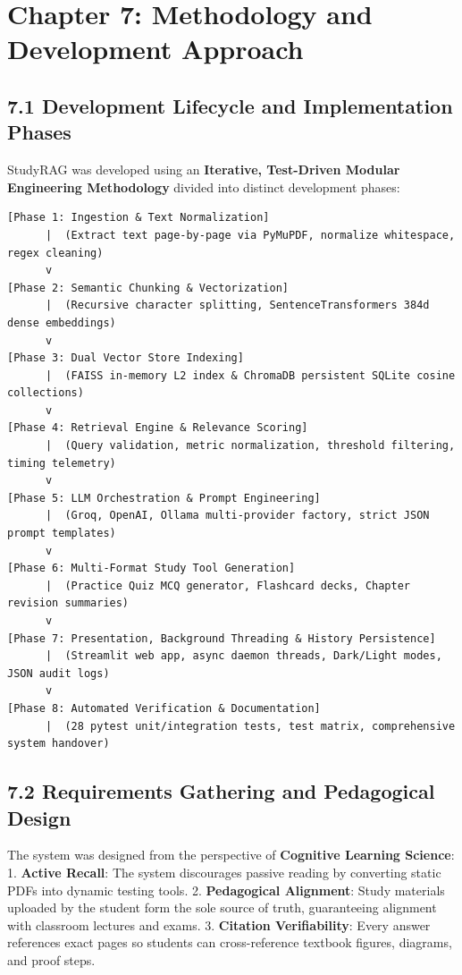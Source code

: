 \documentclass[
]{article}
\begin{document}
\section{Chapter 7: Methodology and Development
Approach}\label{chapter-7-methodology-and-development-approach}

\subsection{7.1 Development Lifecycle and Implementation
Phases}\label{development-lifecycle-and-implementation-phases}

StudyRAG was developed using an \textbf{Iterative, Test-Driven Modular
Engineering Methodology} divided into distinct development phases:

\begin{verbatim}
[Phase 1: Ingestion & Text Normalization]
      |  (Extract text page-by-page via PyMuPDF, normalize whitespace, regex cleaning)
      v
[Phase 2: Semantic Chunking & Vectorization]
      |  (Recursive character splitting, SentenceTransformers 384d dense embeddings)
      v
[Phase 3: Dual Vector Store Indexing]
      |  (FAISS in-memory L2 index & ChromaDB persistent SQLite cosine collections)
      v
[Phase 4: Retrieval Engine & Relevance Scoring]
      |  (Query validation, metric normalization, threshold filtering, timing telemetry)
      v
[Phase 5: LLM Orchestration & Prompt Engineering]
      |  (Groq, OpenAI, Ollama multi-provider factory, strict JSON prompt templates)
      v
[Phase 6: Multi-Format Study Tool Generation]
      |  (Practice Quiz MCQ generator, Flashcard decks, Chapter revision summaries)
      v
[Phase 7: Presentation, Background Threading & History Persistence]
      |  (Streamlit web app, async daemon threads, Dark/Light modes, JSON audit logs)
      v
[Phase 8: Automated Verification & Documentation]
      |  (28 pytest unit/integration tests, test matrix, comprehensive system handover)
\end{verbatim}

\subsection{7.2 Requirements Gathering and Pedagogical
Design}\label{requirements-gathering-and-pedagogical-design}

The system was designed from the perspective of \textbf{Cognitive
Learning Science}: 1. \textbf{Active Recall}: The system discourages
passive reading by converting static PDFs into dynamic testing tools. 2.
\textbf{Pedagogical Alignment}: Study materials uploaded by the student
form the sole source of truth, guaranteeing alignment with classroom
lectures and exams. 3. \textbf{Citation Verifiability}: Every answer
references exact pages so students can cross-reference textbook figures,
diagrams, and proof steps.
\end{document}
